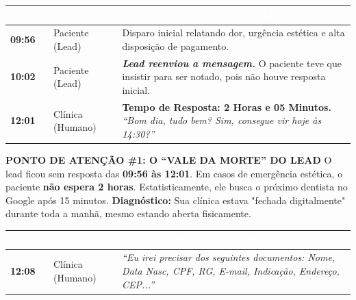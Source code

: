 \documentclass[a4paper,11pt]{article}
\begin{document}
\begin{tcolorbox}[enhanced, frame hidden, colback=white]
    \renewcommand{\arraystretch}{1.5}
    \begin{tabular}{ | p{} | p{} | p{} | }
        \hline
        \rowcolor{infoDentalTeal}
        \textbf{\textcolor{white}{HORA}} & \textbf{\textcolor{white}{AGENTE}} & \textbf{\textcolor{white}{ANÁLISE DE FLUXO E TEMPO}} \\
        \hline
        \textbf{09:56} & Paciente (Lead) &
        \small Disparo inicial relatando dor, urgência estética e alta disposição de pagamento. \\
        \hline
        \textbf{10:02} & Paciente (Lead) &
        \textit{\textbf{Lead reenviou a mensagem.}} O paciente teve que insistir para ser notado, pois não houve resposta inicial. \\
        \hline
        \textbf{12:01} & Clínica (Humano) &
        \textbf{Tempo de Resposta: 2 Horas e 05 Minutos.} \newline
        \textit{``Bom dia, tudo bem? Sim, consegue vir hoje às 14:30?''} \\
        \hline
    \end{tabular}
\end{tcolorbox}

\begin{tcolorbox}[colback=infoDentalOrange!5, colframe=infoDentalOrange, boxrule=0.5pt, arc=0mm, left=2mm, right=2mm]
    \textbf{\textcolor{infoDentalOrange}{PONTO DE ATENÇÃO \#1: O ``VALE DA MORTE'' DO LEAD}}
    \footnotesize
    O lead ficou sem resposta das \textbf{09:56 às 12:01}.
    Em casos de emergência estética, o paciente \textbf{não espera 2 horas}. Estatisticamente, ele busca o próximo dentista no Google após 15 minutos.
    \textbf{Diagnóstico:} Sua clínica estava "fechada digitalmente" durante toda a manhã, mesmo estando aberta fisicamente.
\end{tcolorbox}
\pagebreak

\begin{tcolorbox}[enhanced, frame hidden, colback=white]
    \renewcommand{\arraystretch}{1.5}
    \begin{tabular}{ | p{} | p{} | p{} | }
        \hline
        \rowcolor{infoDentalTeal}
        \textbf{\textcolor{white}{HORA}} & \textbf{\textcolor{white}{AGENTE}} & \textbf{\textcolor{white}{ANÁLISE DE FLUXO E TEMPO}} \\
        \hline
        \textbf{12:08} & Clínica (Humano) &
        \textit{``Eu irei precisar dos seguintes documentos: Nome, Data Nasc, CPF, RG, E-mail, Indicação, Endereço, CEP...''} \\
        \hline
    \end{tabular}
\end{tcolorbox}
\end{document}
